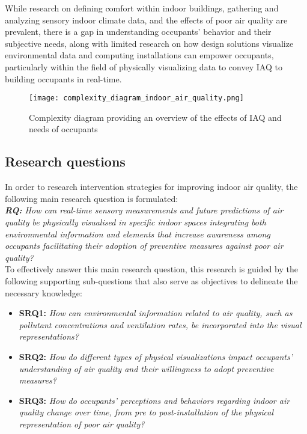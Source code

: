 While research on defining comfort within indoor buildings, gathering and analyzing sensory indoor climate data, and the effects of poor air quality are prevalent, there is a gap in understanding occupants' behavior and their subjective needs, along with limited research on how design solutions visualize environmental data and computing installations can empower occupants, particularly within the field of physically visualizing data to convey IAQ to building occupants in real-time.

\begin{figure}[h]
    \centering
    \texttt{[image: complexity\_diagram\_indoor\_air\_quality.png]}
    \caption{Complexity diagram providing an overview of the effects of IAQ and needs of occupants \cite{schweizer_indoor_2007, wang_how_2021, kim_analyzing_2019}}
    \label{fig:complexity}
\end{figure}



\subsection{Research questions}

In order to research intervention strategies for improving indoor air quality, the following main research question is formulated: \\

\emph{\textbf{RQ:} How can real-time sensory measurements and future predictions of air quality be physically visualised in specific indoor spaces integrating both environmental information and elements that increase awareness among occupants facilitating their adoption of preventive measures against poor air quality?} \\

To effectively answer this main research question, this research is guided by the following supporting sub-questions that also serve as objectives to delineate the necessary knowledge: \\

\begin{itemize}
    \item \textbf{SRQ1:} \emph{How can environmental information related to air quality, such as pollutant concentrations and ventilation rates, be incorporated into the visual representations?}
    \item \textbf{SRQ2:} \emph{How do different types of physical visualizations impact occupants' understanding of air quality and their willingness to adopt preventive measures?}
    \item \textbf{SRQ3:} \emph{How do occupants' perceptions and behaviors regarding indoor air quality change over time, from pre to post-installation of the physical representation of poor air quality?}\\
\end{itemize}